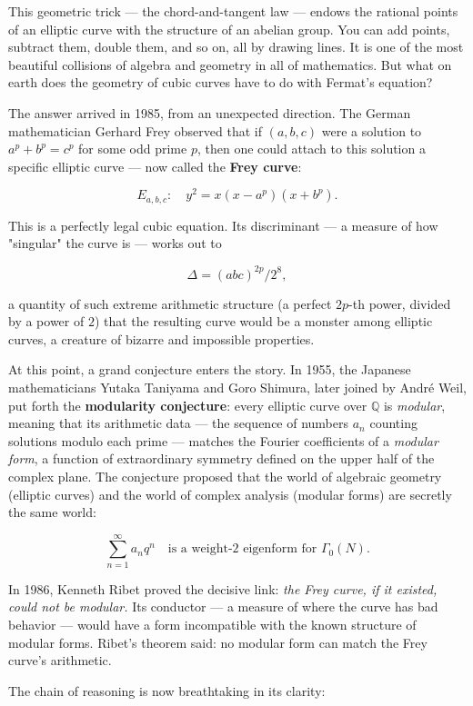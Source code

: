 This geometric trick --- the chord-and-tangent law --- endows the rational points of an elliptic curve with the structure of an abelian group. You can add points, subtract them, double them, and so on, all by drawing lines. It is one of the most beautiful collisions of algebra and geometry in all of mathematics. But what on earth does the geometry of cubic curves have to do with Fermat's equation?

The answer arrived in 1985, from an unexpected direction. The German mathematician Gerhard Frey observed that if $(a, b, c)$ were a solution to $a^p + b^p = c^p$ for some odd prime $p$, then one could attach to this solution a specific elliptic curve --- now called the \textbf{Frey curve}:

\[E_{a,b,c} : \quad y^2 = x(x - a^p)(x + b^p).\]

This is a perfectly legal cubic equation. Its discriminant --- a measure of how "singular" the curve is --- works out to

\[\Delta = (abc)^{2p} / 2^8,\]

a quantity of such extreme arithmetic structure (a perfect $2p$-th power, divided by a power of $2$) that the resulting curve would be a monster among elliptic curves, a creature of bizarre and impossible properties.

At this point, a grand conjecture enters the story. In 1955, the Japanese mathematicians Yutaka Taniyama and Goro Shimura, later joined by Andr\'e Weil, put forth the \textbf{modularity conjecture}: every elliptic curve over $\mathbb{Q}$ is \textit{modular}, meaning that its arithmetic data --- the sequence of numbers $a_n$ counting solutions modulo each prime --- matches the Fourier coefficients of a \textit{modular form}, a function of extraordinary symmetry defined on the upper half of the complex plane. The conjecture proposed that the world of algebraic geometry (elliptic curves) and the world of complex analysis (modular forms) are secretly the same world:

\[\sum_{n=1}^{\infty} a_n q^n \quad \text{is a weight-2 eigenform for } \Gamma_0(N).\]

In 1986, Kenneth Ribet proved the decisive link: \textit{the Frey curve, if it existed, could not be modular.} Its conductor --- a measure of where the curve has bad behavior --- would have a form incompatible with the known structure of modular forms. Ribet's theorem said: no modular form can match the Frey curve's arithmetic.

The chain of reasoning is now breathtaking in its clarity:

